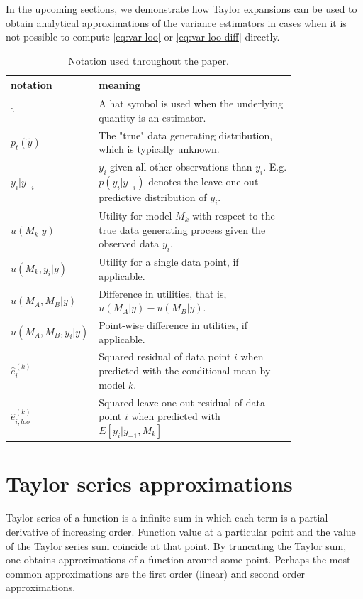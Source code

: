\documentclass{article}
\newcommand{\residual}[2][i]{\hat{e}_{#1}^{(#2)}}
\begin{document}
In the upcoming sections, we demonstrate how Taylor expansions can be used to obtain analytical approximations of the variance estimators in cases when it is not possible to compute \eqref{eq:var-loo} or \eqref{eq:var-loo-diff} directly. 

\begin{table}[!htb]
    \centering
    \begin{tabular}{l | p{0.8\linewidth}}
    \toprule
        notation & meaning \\ \midrule
        $\hat{\cdot}$ & A hat symbol is used when the underlying quantity is an estimator. \\
        $p_t(\tilde{y})$ & The "true" data generating distribution, which is typically unknown. \\
        $y_i | y_{-i}$ & $y_i$ given all other observations than $y_i$. E.g. $p(y_i | y_{-i})$ denotes the leave one out predictive distribution of $y_i$. \\
        $ u(M_k | y) $ & Utility for model $M_k$ with respect to the true data generating process given the observed data $y_i$.  \\
        $u(M_k, y_i | y)$ & Utility for a single data point, if applicable. \\
        $u(M_A, M_B | y)$ & Difference in utilities, that is, $u(M_A | y)- u(M_B | y)$. \\
        $u(M_A, M_B, y_i | y)$ & Point-wise difference in utilities, if applicable. \\
        $\residual{k}$ & Squared residual of data point $i$ when predicted with the conditional mean by model $k$. \\ 
        $\residual[i, loo]{k}$ & Squared leave-one-out residual of data point $i$ when predicted with $E[y_i |y_{-1}, M_k]$ \\
        
    \end{tabular}
    \caption{Notation used throughout the paper.}
    \label{tab:notation}
\end{table}

\section{Taylor series approximations}
Taylor series of a function is a infinite sum in which each term is a partial derivative of increasing order. Function value at a particular point and the value of the Taylor series sum coincide at that point. By truncating the Taylor sum, one obtains approximations of a function around some point. Perhaps the most common approximations are the first order (linear) and second order approximations.
\end{document}
